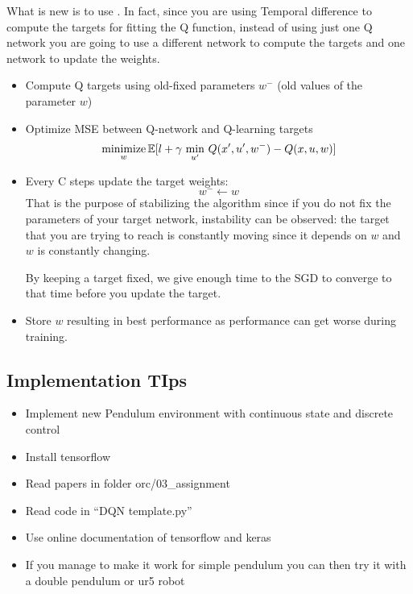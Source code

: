 What is new is to use . In fact, since you are using Temporal difference to compute the targets for fitting the Q function, instead of using just one Q network you are going to use a different network to compute the targets and one network to update the weights.
\begin{itemize}
\item Compute Q targets using old-fixed parameters $w^-$ (old values of the parameter $w$)
\item Optimize MSE between Q-network and Q-learning targets
\[\operatorname*{minimize}_w \mathbb{E}[l + \gamma\,\min_{u'}\, Q(x', u', w^-) - Q(x,u,w)]\]
\item Every C steps update the target weights:
\[w^- \leftarrow w\]
That is the purpose of stabilizing the algorithm since if you do not fix the parameters of your target network, instability can be observed: the target that you are trying to reach is constantly moving since it depends on $w$ and $w$ is constantly changing.

By keeping a target fixed, we give enough time to the SGD to converge to that time before you update the target.
\item Store $w$ resulting in best performance as performance can get worse during training.
\end{itemize}

\subsection{Implementation TIps}
\begin{itemize}
\item Implement new Pendulum environment with continuous state and discrete control
\item Install tensorflow
\item Read papers in folder orc/03\_assignment
\item Read code in ``DQN template.py''
\item Use online documentation of tensorflow and keras
\item If you manage to make it work for simple pendulum you can then try it with a double pendulum or ur5 robot
\end{itemize}








